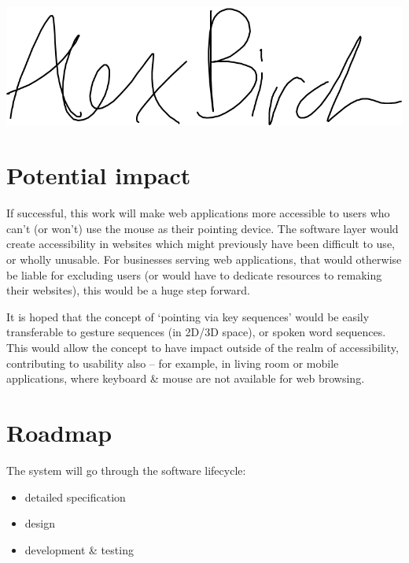 \documentclass[a4paper, 11pt]{article}
\begin{document}
\def\mysig{\underline{\includegraphics[scale=0.15]{signature}}}
\signature{Name}{\mysig}
\signature{Supervisor (if applicable)}{}
\signature{Second Reader (if applicable)}{}
\signature{Project Title}{}
\signature{Date}{}

\section{Potential impact}
If successful, this work will make web applications more accessible to users who can't (or won't) use the mouse as their pointing device. The software layer would create accessibility in websites which might previously have been difficult to use, or wholly unusable. For businesses serving web applications, that would otherwise be liable for excluding users (or would have to dedicate resources to remaking their websites), this would be a huge step forward.

It is hoped that the concept of `pointing via key sequences' would be easily transferable to gesture sequences (in 2D/3D space), or spoken word sequences. This would allow the concept to have impact outside of the realm of accessibility, contributing to usability also -- for example, in living room or mobile applications, where keyboard \& mouse are not available for web browsing.

\section{Roadmap}
The system will go through the software lifecycle:

\begin{itemize}
\item detailed specification
\item design
\item development \& testing
\end{itemize}
\end{document}

